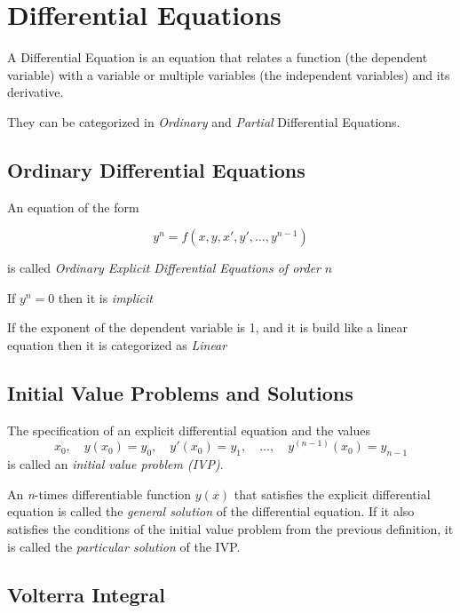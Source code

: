 \newpage
\section{Differential Equations}

A Differential Equation is an equation that relates a function (the dependent variable)
with a variable or multiple variables (the independent variables) and its derivative.
\vspace{\baselineskip}

They can be categorized in \emph{Ordinary} and \emph{Partial} Differential Equations.

\subsection{Ordinary Differential Equations}

An equation of the form 

\[
y^n = f(x, y, x', y', \dots, y^{n -1})
\]

is called \emph{Ordinary Explicit Differential Equations of order} \(n\)
\vspace{\baselineskip}

If \(y^n = 0\) then it is \emph{implicit}
\vspace{\baselineskip}

If the exponent of the dependent variable is 1, and it
is build like a linear equation then it is categorized as \emph{Linear}

\subsection{Initial Value Problems and Solutions}

The specification of an explicit differential equation and the values
\[
x_0,\quad y(x_0) = y_0,\quad y'(x_0) = y_1,\quad \dots,\quad y^{(n-1)}(x_0) = y_{n-1}
\]
is called an \emph{initial value problem (IVP)}.

An \emph{n}-times differentiable function \( y(x) \) that satisfies 
the explicit differential equation is called the \emph{general solution} of the 
differential equation. If it also satisfies the conditions of the initial value problem 
from the previous definition, it is called the \emph{particular solution} of the IVP\@.

\subsection{Volterra Integral}

